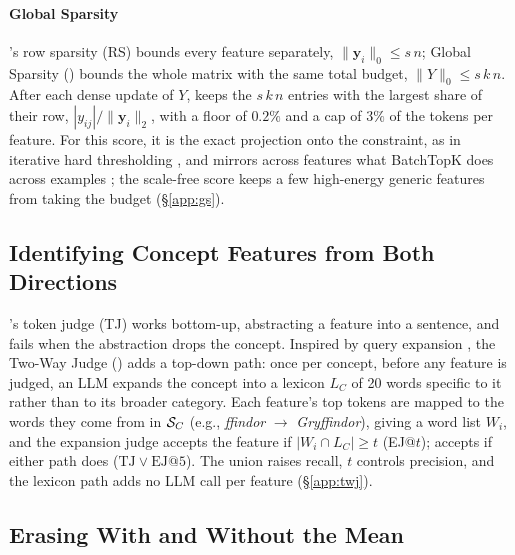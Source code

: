 \paragraph{Global Sparsity}
\ember{}'s row sparsity (RS) bounds every feature separately, $\|\mathbf y_i\|_0 \le s\,n$; Global Sparsity (\gs{}) bounds the whole matrix with the same total budget, $\|Y\|_0 \le s\,k\,n$.
After each dense update of $Y$, \gs{} keeps the $s\,k\,n$ entries with the largest share of their row, $|y_{ij}| / \|\mathbf y_i\|_2$, with a floor of $0.2\%$ and a cap of $3\%$ of the tokens per feature.
For this score, it is the exact projection onto the constraint, as in iterative hard thresholding \citep{blumensath2009iht}, and mirrors across features what BatchTopK does across examples \citep{bussmann2024batchtopk}; the scale-free score keeps a few high-energy generic features from taking the budget (\S\ref{app:gs}).

\subsection{Identifying Concept Features from Both Directions}
\label{sec:twj}

\ember{}'s token judge (TJ) works bottom-up, abstracting a feature into a sentence, and fails when the abstraction drops the concept.
Inspired by query expansion \citep{wang2023query2doc,gao2023hyde}, the Two-Way Judge (\twj{}) adds a top-down path: once per concept, before any feature is judged, an LLM expands the concept into a lexicon $L_C$ of 20 words specific to it rather than to its broader category.
Each feature's top tokens are mapped to the words they come from in $\mathcal{S}_C$ (e.g., \textit{ffindor} $\to$ \textit{Gryffindor}), giving a word list $W_i$, and the expansion judge accepts the feature if $|W_i \cap L_C| \ge t$ (EJ@$t$); \twj{} accepts if either path does ($\text{TJ} \vee \text{EJ@}5$).
The union raises recall, $t$ controls precision, and the lexicon path adds no LLM call per feature (\S\ref{app:twj}).

\subsection{Erasing With and Without the Mean}
\label{sec:cinderz}

